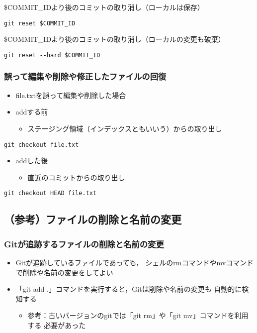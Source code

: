 \documentclass[a4paper,twoside,twocolumn]{bxjsarticle}
\begin{document}
\$COMMIT\_IDより後のコミットの取り消し（ローカルは保存）

\begin{verbatim}
git reset $COMMIT_ID
\end{verbatim}

\$COMMIT\_IDより後のコミットの取り消し（ローカルの変更も破棄）

\begin{verbatim}
git reset --hard $COMMIT_ID
\end{verbatim}

\subsubsection{誤って編集や削除や修正したファイルの回復}
\label{sec-1-7-3}
\begin{itemize}
\item file.txtを誤って編集や削除した場合
\item addする前
\begin{itemize}
\item ステージング領域（インデックスともいいう）からの取り出し
\end{itemize}
\end{itemize}

\begin{verbatim}
git checkout file.txt
\end{verbatim}

\begin{itemize}
\item addした後
\begin{itemize}
\item 直近のコミットからの取り出し
\end{itemize}
\end{itemize}

\begin{verbatim}
git checkout HEAD file.txt
\end{verbatim}

\subsection{（参考）ファイルの削除と名前の変更}
\label{sec-1-8}
\subsubsection{Gitが追跡するファイルの削除と名前の変更}
\label{sec-1-8-1}
\begin{itemize}
\item Gitが追跡しているファイルであっても，
シェルのrmコマンドやmvコマンドで削除や名前の変更をしてよい
\item 「git add .」コマンドを実行すると，Gitは削除や名前の変更も
自動的に検知する
\begin{itemize}
\item 参考：古いバージョンのgitでは「git rm」や「git mv」コマンドを利用する
必要があった
\end{itemize}
\end{itemize}
\end{document}
